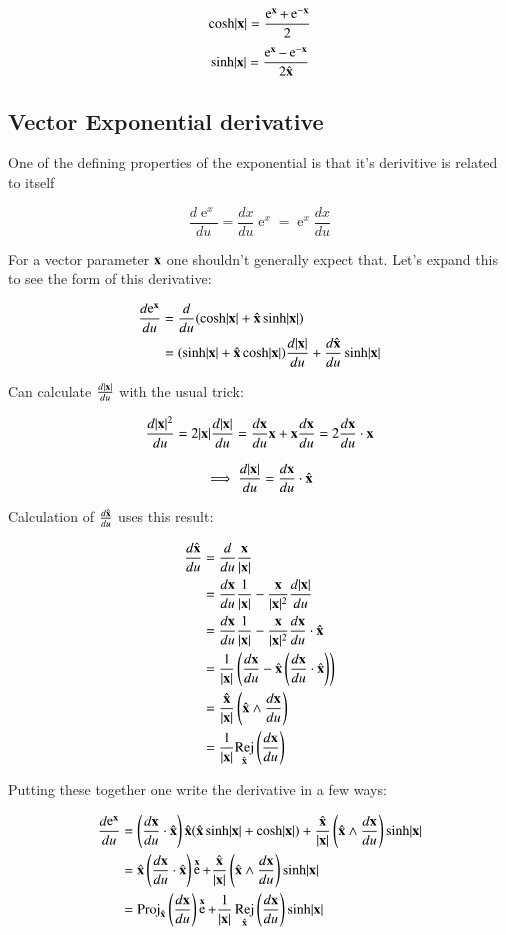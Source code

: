 \documentclass{article}      %
\DeclareMathOperator{\Exp}{e}
\DeclareMathOperator{\Rej}{Rej}
\newcommand{\ddu}[1] {\frac {d{#1}} {du}}
\begin{document}
\[
\cosh\abs{\Bx} = \frac{\Exp^\Bx + \Exp^{-\Bx}}{2}
\]
\[
\sinh\abs{\Bx} = \frac{\Exp^\Bx - \Exp^{-\Bx}}{2\xcap}
\]

\subsection{ Vector Exponential derivative }
One of the defining properties of the exponential is that it's derivitive is related to itself

\[
\ddu{\Exp^{x}} = \ddu{x}\Exp^{x} = \Exp^{x} \ddu{x}
\]

For a vector parameter $\mathbf{x}$ one shouldn't generally expect that.  Let's expand this to see the form of this
derivative:

\begin{align*}
\ddu{\Exp^{\Bx}} 
&= \ddu{}( \cosh\abs{\Bx} + \xcap \sinh\abs{\Bx} ) \\
&= ( \sinh\abs{\Bx} + \xcap \cosh\abs{\Bx} ) \ddu{\abs{\Bx}} + \ddu{\xcap} \sinh\abs{\Bx} \\
\end{align*}

Can calculate $\ddu{\abs{\Bx}}$ with the usual trick:

\[
\ddu{\abs{\Bx}^2} = 2\abs{\Bx}\ddu{\abs{\Bx}} = \ddu{\Bx}\Bx + \Bx\ddu{\Bx} = 2 \ddu{\Bx} \cdot \Bx
\]

\[
\implies
\ddu{\abs{\Bx}} = \ddu{\Bx} \cdot \xcap
\]

Calculation of $\ddu{\xcap}$ uses this result:

\begin{align*}
\ddu{\xcap}
&= \ddu{}\frac{\Bx}{\abs\Bx}  \\
&= \ddu{\Bx}\inv{\abs\Bx} - \frac{\Bx}{\abs{\Bx}^2}\ddu{\abs{\Bx}} \\
&= \ddu{\Bx}\inv{\abs\Bx} - \frac{\Bx}{\abs{\Bx}^2} \ddu{\Bx} \cdot \xcap \\
&= \inv{\abs\Bx}\left( \ddu{\Bx} - \xcap \left(\ddu{\Bx} \cdot \xcap\right) \right) \\
&= \frac{\xcap}{\abs\Bx} \left(\xcap \wedge \ddu{\Bx} \right) \\
&= \inv{\abs\Bx} {\Rej_{\xcap}\left(\ddu{\Bx}\right)} \\
\end{align*}

Putting these together one write the derivative in a few ways:

\begin{align*}
\ddu{\Exp^{\Bx}} 
&= 
\left(\ddu{\Bx} \cdot \xcap\right) \xcap
( \xcap \sinh\abs{\Bx} + \cosh\abs{\Bx} ) 
 + \frac{\xcap}{\abs\Bx} \left(\xcap \wedge \ddu{\Bx} \right) \sinh\abs{\Bx} \\
&= 
\xcap \left(\ddu{\Bx} \cdot \xcap\right)\Exp^{\Bx}
 + \frac{\xcap}{\abs\Bx} \left(\xcap \wedge \ddu{\Bx} \right) \sinh\abs{\Bx} \\
&= 
\Proj_{\xcap}\left(\ddu{\Bx}\right) \Exp^{\Bx}
 + \inv{\abs\Bx} \Rej_{\xcap}\left(\ddu{\Bx}\right) \sinh\abs{\Bx} \\
\end{align*}
\end{document}
